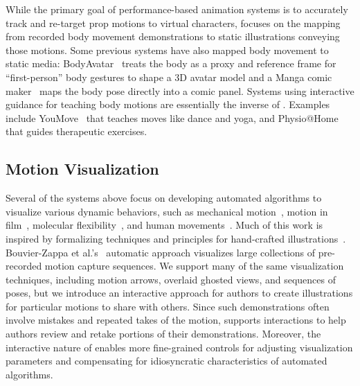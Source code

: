 While the primary goal of performance-based animation systems is to accurately track and re-target prop motions to virtual characters, \systemname{} focuses on the mapping from recorded body movement demonstrations to static illustrations conveying those motions.
Some previous systems have also mapped body movement to static media:
BodyAvatar~\cite{Zhang:2013:BodyAvatar} treats the body as a proxy and reference frame for ``first-person'' body gestures to shape a 3D avatar model and
a Manga comic maker~\cite{lumb_manga_2013} maps the body pose directly into a comic panel.
Systems using interactive guidance for teaching body motions are essentially the inverse of \systemname{}. Examples include YouMove~\cite{anderson2013youmove} that teaches moves like dance and yoga, and Physio@Home~\cite{Tang:2014:Physio@Home} that guides therapeutic exercises.

\subsection{Motion Visualization}

Several of the systems above focus on developing automated algorithms to visualize various dynamic behaviors, such as mechanical motion~\cite{li2008automated,mitra2010illustrating,Seligmann:1991:AGI:127719.122732}, motion in film~\cite{goldman2006schematic}, molecular flexibility~\cite{Bryden-TVCG2012}, and human movements~\cite{assa2005action,bouvier2007motion,choi2012retrieval}.
%
Much of this work is inspired by formalizing techniques and principles for hand-crafted illustrations~\cite{Agrawala:2011:DPV:1924421.1924439}.
%
Bouvier-Zappa et al.'s~\cite{bouvier2007motion} automatic approach visualizes large collections of pre-recorded motion capture sequences.
We support many of the same visualization techniques, including motion arrows, overlaid ghosted views, and sequences of poses, but we introduce an interactive approach for authors to create illustrations for particular motions to share with others.
%
Since such demonstrations often involve mistakes and repeated takes of the motion, \systemname{} supports interactions to help authors review and retake portions of their demonstrations.
Moreover, the interactive nature of \systemname{} enables more fine-grained controls for adjusting visualization parameters and compensating for idiosyncratic characteristics of automated algorithms.
